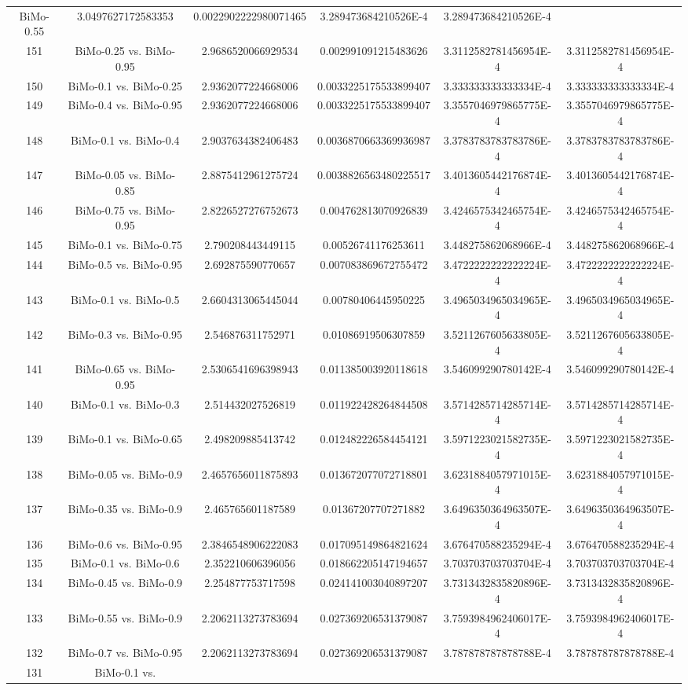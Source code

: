 \documentclass[a4paper,10pt]{article}
\begin{document}
\begin{landscape}
\begin{table}[!htp]
\begin{tabular}{cccccc}
BiMo-0.55&3.0497627172583353&0.0022902222980071465&3.289473684210526E-4&3.289473684210526E-4\\151&BiMo-0.25 vs. BiMo-0.95&2.9686520066929534&0.002991091215483626&3.3112582781456954E-4&3.3112582781456954E-4\\150&BiMo-0.1 vs. BiMo-0.25&2.9362077224668006&0.0033225175533899407&3.333333333333334E-4&3.333333333333334E-4\\149&BiMo-0.4 vs. BiMo-0.95&2.9362077224668006&0.0033225175533899407&3.3557046979865775E-4&3.3557046979865775E-4\\148&BiMo-0.1 vs. BiMo-0.4&2.9037634382406483&0.0036870663369936987&3.3783783783783786E-4&3.3783783783783786E-4\\147&BiMo-0.05 vs. BiMo-0.85&2.8875412961275724&0.0038826563480225517&3.4013605442176874E-4&3.4013605442176874E-4\\146&BiMo-0.75 vs. BiMo-0.95&2.8226527276752673&0.004762813070926839&3.4246575342465754E-4&3.4246575342465754E-4\\145&BiMo-0.1 vs. BiMo-0.75&2.790208443449115&0.00526741176253611&3.448275862068966E-4&3.448275862068966E-4\\144&BiMo-0.5 vs. BiMo-0.95&2.692875590770657&0.007083869672755472&3.4722222222222224E-4&3.4722222222222224E-4\\143&BiMo-0.1 vs. BiMo-0.5&2.6604313065445044&0.00780406445950225&3.4965034965034965E-4&3.4965034965034965E-4\\142&BiMo-0.3 vs. BiMo-0.95&2.546876311752971&0.01086919506307859&3.5211267605633805E-4&3.5211267605633805E-4\\141&BiMo-0.65 vs. BiMo-0.95&2.5306541696398943&0.011385003920118618&3.546099290780142E-4&3.546099290780142E-4\\140&BiMo-0.1 vs. BiMo-0.3&2.514432027526819&0.011922428264844508&3.5714285714285714E-4&3.5714285714285714E-4\\139&BiMo-0.1 vs. BiMo-0.65&2.498209885413742&0.012482226584454121&3.5971223021582735E-4&3.5971223021582735E-4\\138&BiMo-0.05 vs. BiMo-0.9&2.4657656011875893&0.013672077072718801&3.6231884057971015E-4&3.6231884057971015E-4\\137&BiMo-0.35 vs. BiMo-0.9&2.465765601187589&0.01367207707271882&3.6496350364963507E-4&3.6496350364963507E-4\\136&BiMo-0.6 vs. BiMo-0.95&2.3846548906222083&0.017095149864821624&3.676470588235294E-4&3.676470588235294E-4\\135&BiMo-0.1 vs. BiMo-0.6&2.352210606396056&0.018662205147194657&3.703703703703704E-4&3.703703703703704E-4\\134&BiMo-0.45 vs. BiMo-0.9&2.254877753717598&0.024141003040897207&3.7313432835820896E-4&3.7313432835820896E-4\\133&BiMo-0.55 vs. BiMo-0.9&2.2062113273783694&0.027369206531379087&3.7593984962406017E-4&3.7593984962406017E-4\\132&BiMo-0.7 vs. BiMo-0.95&2.2062113273783694&0.027369206531379087&3.787878787878788E-4&3.787878787878788E-4\\131&BiMo-0.1 vs. 
\end{tabular}
\end{table}
\end{landscape}
\end{document}
